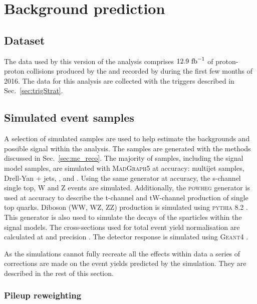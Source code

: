 \chapter{Background prediction} %
\label{chap:backgroundPred}

\section{Dataset} %
\label{sec:dataset}

The data used by this version of the analysis comprises $12.9~\text{fb}^{-1}$ of
proton-proton collisions produced by the \LHC and recorded by \CMS
during the first few months of 2016. The data for this analysis are
collected with the triggers described in Sec.~\ref{sec:trigStrat}.

\section{Simulated event samples} %
\label{sec:simEvents}

A selection of simulated \MC samples are used to help estimate the \SM
backgrounds and possible signal within the analysis. The samples are
generated with the methods discussed in Sec.~\ref{sec:mc_reco}. The
majority of samples, including the signal model samples, are simulated
with \textsc{MadGraph5} \cite{Alwall:2011uj,Alwall:2014hca} at \LO
accuracy: \QCD multijet samples, Drell-Yan + jets, \wj, \zj and \gj.
Using the same generator at \NLO accuracy, the s-channel single top,
{\ttbar}W and {\ttbar}Z events are simulated. Additionally, the
\textsc{powheg} \cite{Alioli:2010xd,Re:2010bp} generator is used at
\NLO accuracy to describe the t-channel and tW-channel production of
single top quarks. Diboson (WW, WZ, ZZ) production is simulated using
\textsc{pythia} 8.2 \cite{Sjostrand:2014zea}. This generator is also
used to simulate the decays of the sparticles within the signal
models. The cross-sections used for total event yield normalisation
are calculated at \NLO and \NNLO precision
\cite{Alwall:2011uj,Re:2010bp,Alioli:2009je,Gavin:2010az,Melia:2011tj,Czakon:2011xx,Gavin:2012sy}.
The detector response is simulated using \textsc{Geant4}
\cite{Agostinelli:2002hh}.

As the simulations cannot fully recreate all the effects within data a
series of corrections are made on the event yields predicted by the
simulation. They are described in the rest of this section.

\subsection{Pileup reweighting}

